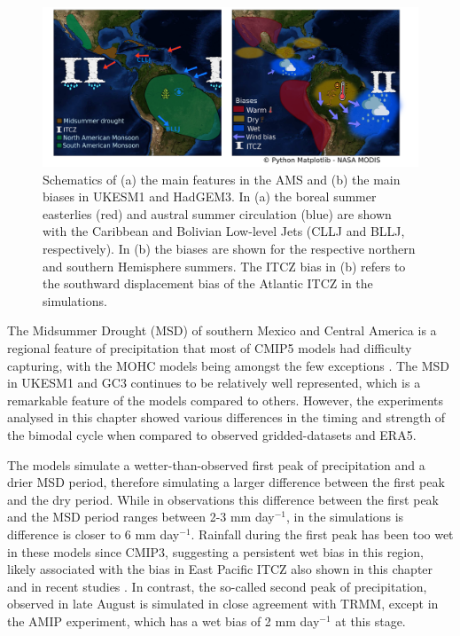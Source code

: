 \begin{figure}[t!]
\centering
 \includegraphics[width=\linewidth]{figures/drawing_d}
\caption{ Schematics of (a) the main features in the AMS and (b) the main biases in UKESM1 and HadGEM3. In (a) the boreal summer easterlies (red) and austral summer circulation (blue) are shown with the Caribbean and Bolivian Low-level Jets (CLLJ and BLLJ, respectively). In (b) the biases are shown for the respective northern and southern Hemisphere summers. The ITCZ bias in (b) refers to the southward displacement bias of the Atlantic ITCZ in the simulations.  }
\label{fig:13}
\end{figure}

    The Midsummer Drought (MSD) of southern Mexico and Central America is a regional feature of precipitation that most of CMIP5 models had difficulty capturing, with the MOHC models being amongst the few exceptions \citep{ryu2014}. 
The MSD in UKESM1 and GC3 continues to be relatively well represented, which is a remarkable feature of the models compared to others. However, the experiments analysed in this chapter showed various  differences in the timing and strength of the bimodal cycle when compared to observed gridded-datasets and ERA5.  

The models simulate a wetter-than-observed first peak of precipitation and a drier MSD period, therefore simulating a larger difference between the first peak and the dry period. While in observations this difference  between the first peak and the MSD period ranges between 2-3 mm day$^{-1}$, in the simulations is difference is closer to 6 mm day$^{-1}$.
Rainfall during the first peak has been too wet in these models since CMIP3, suggesting a persistent wet bias in this region, likely associated with the bias in East Pacific ITCZ also shown in this chapter and in recent studies \citep{ryu2014,mulcahy2018}. 
In contrast, the so-called second peak of precipitation, observed in late August is simulated in close agreement with TRMM, except in the AMIP experiment, which has a wet bias of 2 mm day$^{-1}$ at this stage.

